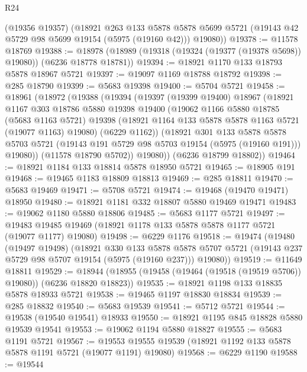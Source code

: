 \begin{lexlean}{R24}
\begin{coremodule}
      (@19356 @19357)
      (@18921
        @263
        @133
        @5878
        @5878
        @5699
        @5721
        (@19143 @42 @5729 @98 @5699 @19154 (@5975 (@19160 @42)))
        @19080))
@19378 := @11578 @18769
@19388 := @18978 (@18989 (@19318 (@19324 (@19377 (@19378 @5698)) @19080)) (@6236 @18778 @18781))
@19394 := @18921 @1170 @133 @18793 @5878 @18967 @5721
@19397 := @19097 @1169 @18788 @18792
@19398 := @285 @18790
@19399 := @5683 @19398
@19400 := @5704 @5721
@19458 := @18961
    (@18972
      (@19388
        (@19394
          (@19397
            (@19399 @19400)
            @18967
            (@18921
              @1167
              @303
              @18786
              @5880
              @19398
              @19400
              (@19062
                @1166
                @5880
                @18785
                (@5683 @1163 @5721)
                @19398
                (@18921 @1164 @133 @5878 @5878 @1163 @5721 (@19077 @1163) @19080)
                (@6229 @1162))
              (@18921
                @301
                @133
                @5878
                @5878
                @5703
                @5721
                (@19143 @191 @5729 @98 @5703 @19154 (@5975 (@19160 @191)))
                @19080))
            (@11578 @18790 @5702))
          @19080))
      (@6236 @18799 @18802))
@19464 := @18921 @1184 @133 @18814 @5878 @18950 @5721
@19465 := @18905 @191
@19468 := @19465 @1183 @18809 @18813
@19469 := @285 @18811
@19470 := @5683 @19469
@19471 := @5708 @5721
@19474 := @19468 (@19470 @19471) @18950
@19480 := @18921 @1181 @332 @18807 @5880 @19469 @19471
@19483 := @19062 @1180 @5880 @18806
@19485 := @5683 @1177 @5721
@19497 := @19483 @19485 @19469 (@18921 @1178 @133 @5878 @5878 @1177 @5721 (@19077 @1177) @19080)
@19498 := @6229 @1176
@19518 := @19474
    (@19480
      (@19497 @19498)
      (@18921
        @330
        @133
        @5878
        @5878
        @5707
        @5721
        (@19143 @237 @5729 @98 @5707 @19154 (@5975 (@19160 @237)))
        @19080))
@19519 := @11649 @18811
@19529 := @18944 (@18955 (@19458 (@19464 (@19518 (@19519 @5706)) @19080)) (@6236 @18820 @18823))
@19535 := @18921 @1198 @133 @18835 @5878 @18933 @5721
@19538 := @19465 @1197 @18830 @18834
@19539 := @285 @18832
@19540 := @5683 @19539
@19541 := @5712 @5721
@19544 := @19538 (@19540 @19541) @18933
@19550 := @18921 @1195 @845 @18828 @5880 @19539 @19541
@19553 := @19062 @1194 @5880 @18827
@19555 := @5683 @1191 @5721
@19567 := @19553 @19555 @19539 (@18921 @1192 @133 @5878 @5878 @1191 @5721 (@19077 @1191) @19080)
@19568 := @6229 @1190
@19588 := @19544

\end{coremodule}
\end{lexlean}
